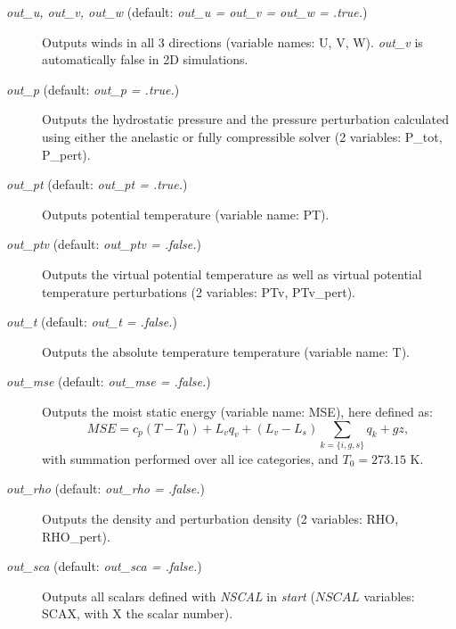 \documentclass[12pt,A4,french]{article}
\begin{document}
\begin{description}

\item[{\it out\_u, out\_v, out\_w} (default: {\it out\_u = out\_v = out\_w = .true.})]

Outputs winds in all 3 directions (variable names: U, V, W). {\it out\_v} is automatically false in 2D simulations.

\item[{\it out\_p} (default: {\it out\_p = .true.})]

Outputs the hydrostatic pressure and the pressure perturbation calculated using either the anelastic or fully compressible solver (2 variables: P\_tot, P\_pert).

\item[{\it out\_pt} (default: {\it out\_pt = .true.})]

Outputs potential temperature (variable name: PT).

\item[{\it out\_ptv} (default: {\it out\_ptv = .false.})]

Outputs the virtual potential temperature as well as virtual potential temperature perturbations (2 variables: PTv, PTv\_pert).

\item[{\it out\_t} (default: {\it out\_t = .false.})]

Outputs the absolute temperature temperature (variable name: T).

\item[{\it out\_mse} (default: {\it out\_mse = .false.})]

Outputs the moist static energy (variable name: MSE), here defined as:
\begin{equation}
    MSE = c_p\left(T - T_0\right) + L_v q_v + \left(L_v - L_s\right)\sum_{k=\{i,g,s\}} q_k + g z,
\end{equation}
with summation performed over all ice categories, and $T_0 = 273.15$ K.

\item[{\it out\_rho} (default: {\it out\_rho = .false.})]

Outputs the density and perturbation density (2 variables: RHO, RHO\_pert).

\item[{\it out\_sca} (default: {\it out\_sca = .false.})]

Outputs all scalars defined with {\it NSCAL} in {\it start} ($NSCAL$ variables: SCAX, with X the scalar number).


\end{description}
\end{document}
